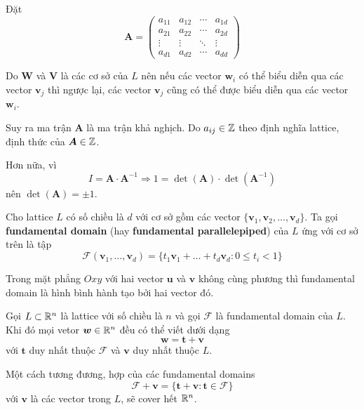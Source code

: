 Đặt
\begin{equation*}
    \bm{A} = \begin{pmatrix}
        a_{11} & a_{12} & \cdots & a_{1d} \\
        a_{21} & a_{22} & \cdots & a_{2d} \\
        \vdots & \vdots & \ddots & \vdots \\
        a_{d1} & a_{d2} & \cdots & a_{dd}
    \end{pmatrix}
\end{equation*}

Do $\bm{W}$ và $\bm{V}$ là các cơ sở của $L$ nên nếu các vector $\bm{w}_i$ có thể biểu diễn qua các vector $\bm{v}_j$ thì ngược lại, các vector $\bm{v}_j$ cũng có thể được biểu diễn qua các vector $\bm{w}_i$.

Suy ra ma trận $\bm{A}$ là ma trận khả nghịch. Do $a_{ij} \in \mathbb{Z}$ theo định nghĩa lattice, định thức của $\bm{A} \in \mathbb{Z}$.

Hơn nữa, vì
\begin{equation*}
    I = \bm{A} \cdot \bm{A}^{-1} \Rightarrow 1 = \det (\bm{A}) \cdot \det (\bm{A}^{-1})
\end{equation*}
nên $\det(\bm{A}) = \pm 1$.

\begin{definition}
    Cho lattice $L$ có số chiều là $d$ với cơ sở gồm các vector $\{ \bm{v}_1, \bm{v}_2, \ldots, \bm{v}_d \}$. Ta gọi \textbf{fundamental domain} (hay \textbf{fundamental parallelepiped}) của $L$ ứng với cơ sở trên là tập
    \begin{equation}
        \mathcal{F} (\bm{v}_1, \ldots, \bm{v}_d) = \{ t_1 \bm{v}_1 + \ldots + t_d \bm{v}_d : 0 \leqslant t_i < 1 \}
    \end{equation}
\end{definition}

Trong mặt phẳng $Oxy$ với hai vector $\bm{u}$ và $\bm{v}$ không cùng phương thì fundamental domain là hình bình hành tạo bởi hai vector đó.

\begin{remark}
    Gọi $L \subset \mathbb{R}^n$ là lattice với số chiều là $n$ và gọi $\mathcal{F}$ là fundamental domain của $L$. Khi đó mọi vetor $\bm{w} \in \mathbb{R}^n$ đều có thể viết dưới dạng
    \begin{equation*}
        \bm{w} = \bm{t} + \bm{v}
    \end{equation*}
    với $\bm{t}$ duy nhất thuộc $\mathcal{F}$ và $\bm{v}$ duy nhất thuộc $L$.

    Một cách tương đương, hợp của các fundamental domains
    \begin{equation*}
        \mathcal{F} + \bm{v} = \{ \bm{t} + \bm{v} : \bm{t} \in \mathcal{F} \}
    \end{equation*}
    với $\bm{v}$ là các vector trong $L$, sẽ cover hết $\mathbb{R}^n$.
\end{remark}

